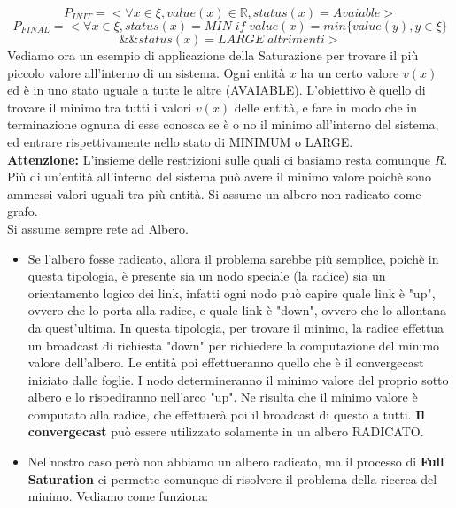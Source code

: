 $$P_{INIT} = < \forall x \in \xi, value(x) \in \mathbb{R}, status(x) = Avaiable>$$
$$
P_{FINAL} =   < 
  \forall x \in \xi, status(x)= MIN \; if \; value(x) = min
\{value(y), y \in \xi \}$$$$ \&\&  status(x) = LARGE \;altrimenti >$$
Vediamo ora un esempio di applicazione della Saturazione per trovare il più piccolo valore all'interno di un sistema. Ogni entità $x$ ha un certo valore $v(x)$ ed è in uno stato uguale a tutte le altre (AVAIABLE). L'obiettivo è quello di trovare il minimo tra tutti i valori $v(x)$ delle entità, e fare in modo che in terminazione ognuna di esse conosca se è o no il minimo all'interno del sistema, ed entrare rispettivamente nello stato di MINIMUM o LARGE.\\
\textbf{Attenzione:} L'insieme delle restrizioni sulle quali ci basiamo resta comunque $R$. Più di un'entità all'interno del sistema può avere il minimo valore poichè sono ammessi valori uguali tra più entità. Si assume un albero non radicato come grafo.\\
Si assume sempre rete ad Albero.
\begin{itemize}
    \item Se l'albero fosse radicato, allora il problema sarebbe più semplice, poichè in questa tipologia, è presente sia un nodo speciale (la radice) sia un orientamento logico dei link, infatti ogni nodo può capire quale link è "up", ovvero che lo porta alla radice, e quale link è "down", ovvero che lo allontana da quest'ultima. In questa tipologia, per trovare il minimo, la radice effettua un broadcast di richiesta "down" per richiedere la computazione del minimo valore dell'albero. Le entità poi effettueranno quello che è il convergecast iniziato dalle foglie. I nodo determineranno il minimo valore del proprio sotto albero e lo rispediranno nell'arco "up". Ne risulta che il minimo valore è computato alla radice, che effettuerà poi il broadcast di questo a tutti. \textbf{Il convergecast} può essere utilizzato solamente in un albero RADICATO.
    \item Nel nostro caso però non abbiamo un albero radicato, ma il processo di \textbf{Full Saturation} ci permette comunque di risolvere il problema della ricerca del minimo. Vediamo come funziona:
\end{itemize}

